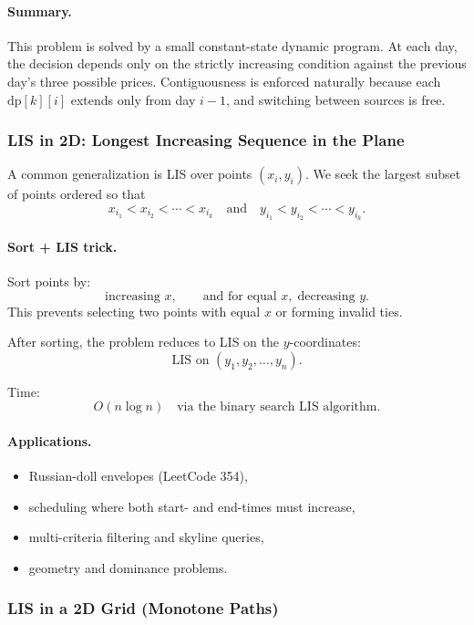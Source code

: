 \documentclass[9pt]{extarticle}
\begin{document}
\paragraph{Summary.}
This problem is solved by a small constant-state dynamic program.  
At each day, the decision depends only on the strictly increasing condition
against the previous day’s three possible prices.  
Contiguousness is enforced naturally because each $\mathrm{dp}[k][i]$ extends only
from day $i-1$, and switching between sources is free.

\subsubsection{ LIS in 2D: Longest Increasing Sequence in the Plane}

A common generalization is LIS over points $(x_i,y_i)$.
We seek the largest subset of points ordered so that
\[
x_{i_1} < x_{i_2} < \cdots < x_{i_k}
\quad\text{and}\quad
y_{i_1} < y_{i_2} < \cdots < y_{i_k}.
\]

\paragraph{Sort + LIS trick.}
Sort points by:
\[
\text{increasing } x,\qquad
\text{and for equal } x,\;\text{decreasing } y.
\]
This prevents selecting two points with equal $x$ or forming invalid ties.

After sorting, the problem reduces to LIS on the $y$-coordinates:
\[
\text{LIS on } (y_1,y_2,\dots,y_n).
\]

Time:
\[
O(n\log n) \quad \text{via the binary search LIS algorithm}.
\]

\paragraph{Applications.}
\begin{itemize}
    \item Russian-doll envelopes (LeetCode 354),
    \item scheduling where both start- and end-times must increase,
    \item multi-criteria filtering and skyline queries,
    \item geometry and dominance problems.
\end{itemize}

\subsubsection{LIS in a 2D Grid (Monotone Paths)}
\end{document}
